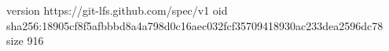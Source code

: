 version https://git-lfs.github.com/spec/v1
oid sha256:18905cf8f5afbbbd8a4a798d0c16aec032fcf35709418930ac233dea2596dc78
size 916
